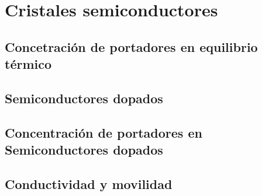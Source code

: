 \chapter{Cristales semiconductores} \label{Ch:09}

\section{Concetración de portadores en equilibrio térmico}

\section{Semiconductores dopados}

\section{Concentración de portadores en Semiconductores dopados}

\section{Conductividad y movilidad}

